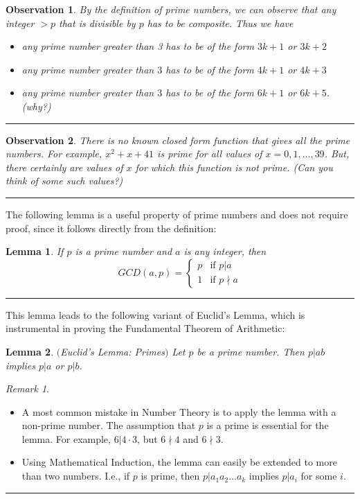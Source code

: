 \documentclass[12pt]{article}
\theoremstyle{plain}
\newtheorem{lemma}{Lemma}
\newtheorem{observation}{Observation}
\theoremstyle{definition}
\theoremstyle{remark}
\newtheorem{remark}{Remark}
\begin{document}
\begin{observation}
By the definition of prime numbers, we can observe that any integer $>p$ that is divisible by $p$ has to be composite. Thus we have
\begin{itemize}
    \item any prime number greater than 3 has to be of the form $3k+1$ or $3k+2$
    \item any prime number greater than $3$ has to be of the form $4k+1$ or $4k+3$
    \item any prime number greater than $3$ has to be of the form $6k+1$ or $6k+5$. (why?)
\end{itemize}
\end{observation}
\hrule

\begin{observation}
There is no known closed form function that gives all the prime numbers. For example, $x^2+x+41$ is prime for all values of $x=0, 1, \dots, 39$. But, there certainly are values of $x$ for which this function is not prime. (Can you think of some such values?)
\end{observation}
\hrule

\bigskip
\noindent

The following lemma is a useful property of prime numbers and does not require proof, since it follows directly from the definition:
\begin{lemma}
If $p$ is a prime number and $a$ is any integer, then
$$GCD(a,p) = \left \{ \begin{array}{ll}
p & \textrm{if $p|a$ }\\
1 & \textrm {if $p\nmid a$}
\end{array}\right.$$
\end{lemma}

\hrule

\bigskip
\noindent
This lemma leads to the following variant of Euclid's Lemma, which is instrumental in proving the Fundamental Theorem of Arithmetic:
\begin{lemma}$($Euclid's Lemma: Primes$)$ Let $p$ be a prime number. Then $p|ab$ implies $p|a$ or $p|b$.
\end{lemma}

\bigskip
\noindent
\begin{remark}
\begin{itemize}
\item A most common mistake in Number Theory is to apply the lemma with a non-prime number. The assumption that $p$ is a prime is essential for the lemma. For example, $6|4\cdot 3$, but $6\nmid 4$ and $6\nmid 3$.
\item Using Mathematical Induction, the lemma can easily be extended to more than two numbers. I.e., if $p$ is prime, then
$p|a_1a_2\dots a_k$ implies $p|a_i$ for some $i$.
\end{itemize}
\end{remark}
\hrule
\end{document}
